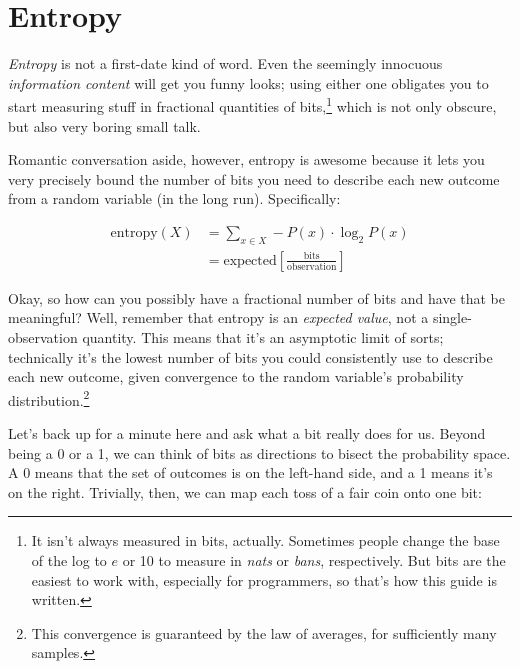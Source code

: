 \documentclass{article}
\begin{document}
\section{Entropy}\label{sec:entropy}
  {\em Entropy} is not a first-date kind of word. Even the seemingly innocuous
  {\em information content} will get you funny looks; using either one
  obligates you to start measuring stuff in fractional quantities of
  bits,\footnote{It isn't always measured in bits, actually. Sometimes people
  change the base of the log to $e$ or 10 to measure in {\em nats} or {\em
  bans}, respectively. But bits are the easiest to work with, especially for
  programmers, so that's how this guide is written.} which is not only obscure,
  but also very boring small talk.

  Romantic conversation aside, however, entropy is awesome because it lets you
  very precisely bound the number of bits you need to describe each new outcome
  from a random variable (in the long run). Specifically:

  \begin{align*}
  \textrm{entropy}(X) & = \sum_{x \in X} -P(x) \cdot \log_2 P(x) \\
                      & = \textrm{expected}
                          \left[ \frac{\textrm{bits}}
                                      {\textrm{observation}} \right]
  \end{align*}

  Okay, so how can you possibly have a fractional number of bits and have that
  be meaningful? Well, remember that entropy is an {\em expected value}, not a
  single-observation quantity. This means that it's an asymptotic limit of
  sorts; technically it's the lowest number of bits you could consistently use
  to describe each new outcome, given convergence to the random variable's
  probability distribution.\footnote{This convergence is guaranteed by the law
  of averages, for sufficiently many samples.}

  Let's back up for a minute here and ask what a bit really does for us. Beyond
  being a 0 or a 1, we can think of bits as directions to bisect the
  probability space. A 0 means that the set of outcomes is on the left-hand
  side, and a 1 means it's on the right. Trivially, then, we can map each toss
  of a fair coin onto one bit:

  \newcommand{\thline}[2]{\linethickness{#1mm}\line(1, 0){#2}}
\end{document}
